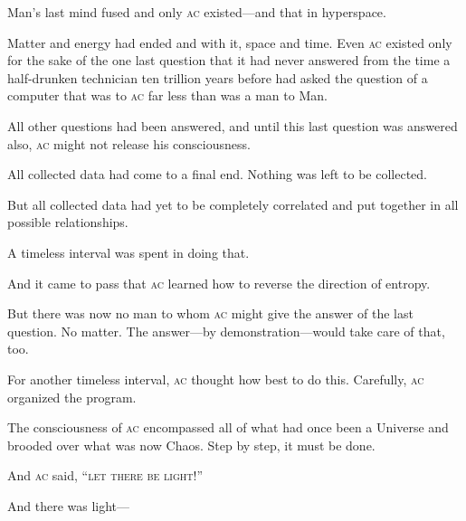 Man's last mind fused and only \textsc{ac} existed---and that in hyperspace.

Matter and energy had ended and with it, space and time. Even \textsc{ac} existed only for the sake of the one last question that it had never answered from the time a half-drunken technician ten trillion years before had asked the question of a computer that was to \textsc{ac} far less than was a man to Man.

All other questions had been answered, and until this last question was answered also, \textsc{ac} might not release his consciousness.

All collected data had come to a final end. Nothing was left to be collected.

But all collected data had yet to be completely correlated and put together in all possible relationships.

A timeless interval was spent in doing that.

And it came to pass that \textsc{ac} learned how to reverse the direction of entropy.

But there was now no man to whom \textsc{ac} might give the answer of the last question. No matter. The answer---by demonstration---would take care of that, too.

For another timeless interval, \textsc{ac} thought how best to do this. Carefully, \textsc{ac} organized the program.

The consciousness of \textsc{ac} encompassed all of what had once been a Universe and brooded over what was now Chaos. Step by step, it must be done.

And \textsc{ac} said, \enquote{\textsc{let there be light!}}

And there was light---
